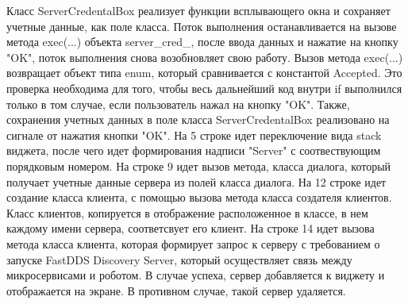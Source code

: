 \documentclass[a4paper, 14pt]{extreport}
\begin{document}
\par Класс ServerCredentalBox реализует функции всплывающего окна и сохраняет учетные данные, как поле класса. Поток выполнения останавливается 
на вызове метода exec(...) объекта server\_cred\_, после ввода данных и нажатие на кнопку "OK", поток выполнения снова возобновляет свою работу.
Вызов метода exec(...) возвращает объект типа enum, который сравнивается с константой Accepted. Это проверка необходима для того, чтобы 
весь дальнейший код внутри if выполнился только в том случае, если пользователь нажал на кнопку "OK". Также, сохранения учетных данных 
в поле класса ServerCredentalBox реализовано на сигнале от нажатия кнопки "OK". На 5 строке идет переключение вида stack виджета, после 
чего идет формирования надписи "Server" с соотвествующим порядковым номером. На строке 9 идет вызов метода, класса диалога, который 
получает учетные данные сервера из полей класса диалога. На 12 строке идет создание класса клиента, с помощью вызова метода класса 
создателя клиентов. Класс клиентов, копируется в отображение расположенное в классе, в нем каждому имени сервера, соответсвует его 
клиент. На строке 14 идет вызова метода класса клиента, которая формирует запрос к серверу с требованием о запуске FastDDS Discovery 
Server, который осуществляет связь между микросервисами и роботом. В случае успеха, сервер добавляется к виджету и отображается на 
экране. В противном случае, такой сервер удаляется.
\end{document}
